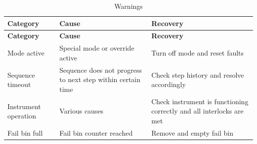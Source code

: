 \hypertarget{faults_faults_warn_tbl}{}
\tabulinesep=1mm
\begin{longtabu}spread 0pt [c]{*{3}{|X[-1]}|}
\caption{Warnings}\label{faults_faults_warn_tbl}\\
\hline
\cellcolor{\tableheadbgcolor}\textbf{ Category}&\cellcolor{\tableheadbgcolor}\textbf{ Cause}&\cellcolor{\tableheadbgcolor}\textbf{ Recovery }\\
\endfirsthead
\hline
\endfoot
\hline
\cellcolor{\tableheadbgcolor}\textbf{ Category}&\cellcolor{\tableheadbgcolor}\textbf{ Cause}&\cellcolor{\tableheadbgcolor}\textbf{ Recovery }\\
\endhead
Mode active&Special mode or override active&Turn off mode and reset faults \\
Sequence timeout&Sequence does not progress to next step within certain time&Check step history and resolve accordingly \\
Instrument operation&Various causes&Check instrument is functioning correctly and all interlocks are met \\
Fail bin full&Fail bin counter reached&Remove and empty fail bin \\
\end{longtabu}
